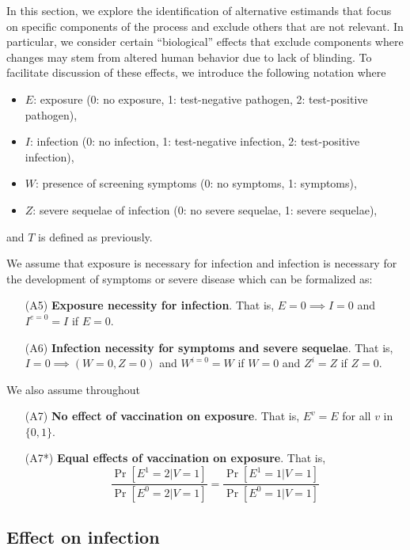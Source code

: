 \begin{appendix}
    In this section, we explore the identification of alternative estimands that focus on specific components of the process and exclude others that are not relevant. In particular, we consider certain ``biological'' effects that exclude components where changes may stem from altered human behavior due to lack of blinding. To facilitate discussion of these effects, we introduce the following notation where 
    \begin{itemize}
        \item $E$: exposure (0: no exposure, 1: test-negative pathogen, 2: test-positive pathogen),
        \item $I$: infection (0: no infection, 1: test-negative infection, 2: test-positive infection),
        \item $W$: presence of screening symptoms (0: no symptoms, 1: symptoms),
        \item $Z$: severe sequelae of infection (0: no severe sequelae, 1: severe sequelae),
    \end{itemize}
    and $T$ is defined as previously. 
    
    
    
    
    
    We assume that exposure is necessary for infection and infection is necessary for the development of symptoms or severe disease which can be formalized as:
    \begin{itemize}
        \item [(A5)] \textbf{Exposure necessity for infection}. That is, $E = 0 \implies I = 0$ and $I^{e=0} = I$ if $E = 0$.
        \item [(A6)] \textbf{Infection necessity for symptoms and severe sequelae}. That is, \\$I = 0 \implies (W = 0, Z = 0)$ and $W^{i=0} = W$ if $W = 0$ and $Z^i=Z$ if $Z=0$.
    \end{itemize}
    We also assume throughout
    \begin{itemize}
        \item [(A7)] \textbf{No effect of vaccination on exposure}. That is, $E^{v} = E$ for all $v$ in $\{0, 1\}$.
        \item [(A7*)] \textbf{Equal effects of vaccination on exposure}. That is, 
        \[\dfrac{\Pr[E^1=2 | V=1]}{\Pr[E^0=2 | V=1]} = \dfrac{\Pr[E^1=1 | V=1]}{\Pr[E^0=1 | V=1]}\]
    \end{itemize}



    \subsection{Effect on infection}


\end{appendix}
